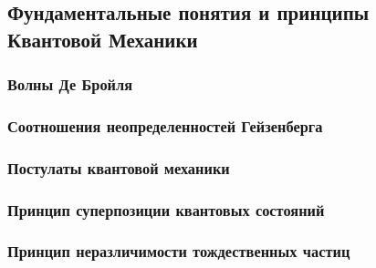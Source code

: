 \subsection{Фундаментальные понятия и принципы Квантовой Механики}

\subsubsection{Волны Де Бройля}

\subsubsection{Соотношения неопределенностей Гейзенберга}

\subsubsection{Постулаты квантовой механики}

\subsubsection{Принцип суперпозиции квантовых состояний}

\subsubsection{Принцип неразличимости тождественных частиц}
